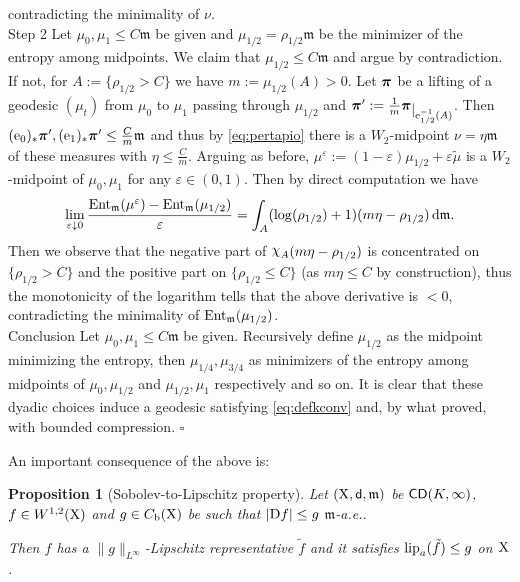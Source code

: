 \documentclass[11pt]{article}
\numberwithin{equation}{section}
\newtheorem{proposition}[theorem]{Proposition}
\newenvironment{idea}{\removelastskip\par\medskip   %
\noindent{\em Idea of the proof} \rm}{\penalty-20\null\hfill$\square$\par\medbreak}
\newcommand{\ppi}{{\mbox{\boldmath$\pi$}}}
\newcommand{\restr}[1]{\lower3pt\hbox{$|_{#1}$}}
\newcommand{\e}{{\rm e}}
\newcommand{\X}{{\rm X}}
\newcommand{\sfd}{{\sf d}}
\newcommand{\mm}{{\mathfrak m}}
\newcommand{\CD}{{\sf CD}}
\newcommand{\ent}{{\rm Ent}_\mm}
\renewcommand{\d}{{\rm d}}
\newcommand{\D}{{\rm D}}
\newcommand{\lipa}{{\rm lip}_a}
\renewcommand{\b}{{\rm b}}
\newcommand{\nchi}{{\raise.3ex\hbox{$\chi$}}}
\newcommand{\eps}{\varepsilon}
\begin{document}
\begin{idea}
\[\]
contradicting the minimality of $\nu$.\\
{\sc Step 2} Let $\mu_0,\mu_1\leq C\mm$  be given and $\mu_{1/2}=\rho_{1/2}\mm$ be the minimizer of the entropy among midpoints. We claim that $\mu_{1/2}\leq C\mm$ and argue by contradiction. If not, for $A:=\{\rho_{1/2}>C\}$ we have $m:=\mu_{1/2}(A)>0$. Let $\ppi$ be a lifting of a geodesic $(\mu_t)$ from $\mu_0$ to $\mu_1$ passing through $\mu_{1/2}$ and $\ppi':=\tfrac1m\ppi\restr{\e_{1/2}^{-1}(A)}$. Then $(\e_0)_*\ppi',(\e_1)_*\ppi'\leq \tfrac Cm\mm$ and thus by \eqref{eq:pertapio} there is a $W_2$-midpoint $\nu=\eta\mm$ of these measures with $\eta\leq \tfrac Cm$. Arguing as before, $\mu^\eps:=(1-\eps)\mu_{1/2}+\eps\tilde\mu$ is a  $W_2$-midpoint of $\mu_0,\mu_1$ for any $\eps\in(0,1)$. Then  by direct computation we have
\[
\begin{split}
\lim_{\eps\downarrow0}\frac{\ent(\mu^\eps)-\ent(\mu_{1/2})}\eps=\int_{A}(\log(\rho_{1/2})+1)(m\eta-\rho_{1/2})\,\d\mm.
\end{split}
\]
Then we observe that the negative part of $\nchi_A(m\eta-\rho_{1/2})$ is concentrated on $\{\rho_{1/2}>C\}$ and the positive part on $\{\rho_{1/2}\leq C\}$ (as $m\eta\leq C$ by construction), thus the monotonicity of the logarithm  tells that the above derivative is $<0$, contradicting the minimality of $\ent(\mu_{1/2})$. \\
{\sc Conclusion}  Let $\mu_0,\mu_1\leq C\mm$  be given. Recursively define $\mu_{1/2}$ as the midpoint minimizing the entropy, then  $\mu_{1/4},\mu_{3/4}$ as minimizers of the entropy among midpoints of $\mu_0,\mu_{1/2}$ and $\mu_{1/2},\mu_1$ respectively and so on. It is clear that these dyadic choices induce a geodesic satisfying \eqref{eq:defkconv} and, by what proved, with bounded compression.
\end{idea}
An important consequence of the above is:
\begin{proposition}[Sobolev-to-Lipschitz property]\label{prop:sobtolip} Let $(\X,\sfd,\mm)$ be $\CD(K,\infty)$,  $f\in W^{1,2}(\X)$ and $g\in C_\b(\X)$ be such that $|\D f|\leq g$ $\mm$-a.e.. 

Then $f$ has a $\|g\|_{L^\infty}$-Lipschitz representative $\tilde f$ and it satisfies $\lipa(\tilde f)\leq g$  on $\X$. 
\end{proposition}
\end{document}
